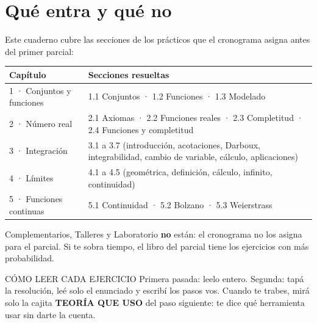 \section*{Qué entra y qué no}
Este cuaderno cubre las secciones de los prácticos que el cronograma asigna antes del primer parcial:

\begin{center}\small
\begin{tabularx}{\linewidth}{@{}l X@{}}
\toprule
\textbf{Capítulo} & \textbf{Secciones resueltas} \\ \midrule
1 · Conjuntos y funciones & 1.1 Conjuntos · 1.2 Funciones · 1.3 Modelado \\
2 · Número real & 2.1 Axiomas · 2.2 Funciones reales · 2.3 Completitud · 2.4 Funciones y completitud \\
3 · Integración & 3.1 a 3.7 (introducción, acotaciones, Darboux, integrabilidad, cambio de variable, cálculo, aplicaciones) \\
4 · Límites & 4.1 a 4.5 (geométrica, definición, cálculo, infinito, continuidad) \\
5 · Funciones continuas & 5.1 Continuidad · 5.2 Bolzano · 5.3 Weierstrass \\ \bottomrule
\end{tabularx}
\end{center}

Complementarios, Talleres y Laboratorio \textbf{no} están: el cronograma no los asigna para el parcial. Si te sobra tiempo, el libro del parcial tiene los ejercicios con más probabilidad.

\begin{tip}{CÓMO LEER CADA EJERCICIO}
Primera pasada: leelo entero. Segunda: tapá la resolución, leé solo el enunciado y escribí los pasos vos. Cuando te trabes, mirá solo la cajita \textbf{TEORÍA QUE USO} del paso siguiente: te dice qué herramienta usar sin darte la cuenta.
\end{tip}

